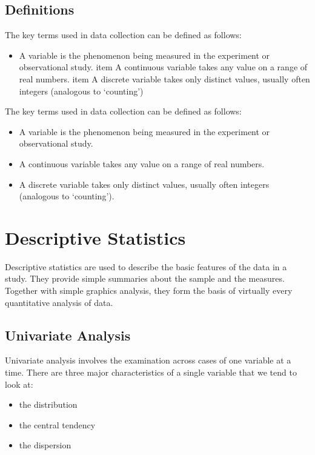 \documentclass[12pt]{article}
\begin{document}
\subsection*{Deﬁnitions}
The key terms used in data collection can be deﬁned as follows:
\begin{itemize}
\item A variable is the phenomenon being measured in the experiment or observational
study.
item A continuous variable takes any value on a range of real numbers.
item A discrete variable takes only distinct values, usually often integers (analogous to
‘counting’)
\end{itemize}

The key terms used in data collection can be defined as follows:
\begin{itemize}

\item A variable is the phenomenon being measured in the experiment or observational
study.
\item  A continuous variable takes any value on a range of real numbers.
\item  A discrete variable takes only distinct values, usually often integers (analogous to `counting’).
\end{itemize}

\newpage
\section{Descriptive Statistics}
Descriptive statistics are used to describe the basic features of the data in a study. They provide simple summaries about the sample and the measures. Together with simple graphics analysis, they form the basis of virtually every quantitative analysis of data.

\subsection{Univariate Analysis}

Univariate analysis involves the examination across cases of one variable at a time. There are three major characteristics of a single variable that we tend to look at:

\begin{itemize}
\item the distribution
\item the central tendency
\item the dispersion
\end{itemize}
\end{document}

